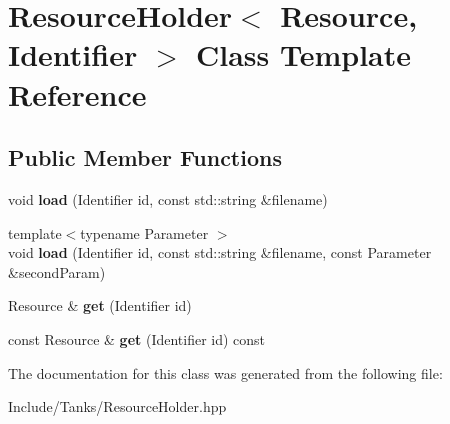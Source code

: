 \hypertarget{class_resource_holder}{}\section{Resource\+Holder$<$ Resource, Identifier $>$ Class Template Reference}
\label{class_resource_holder}
\subsection*{Public Member Functions}
\begin{DoxyCompactItemize}
\item 
\hypertarget{class_resource_holder_accb6a2b6bd2da503ddfd57b5c0028a16}{}void {\bfseries load} (Identifier id, const std\+::string \&filename)\label{class_resource_holder_accb6a2b6bd2da503ddfd57b5c0028a16}

\item 
\hypertarget{class_resource_holder_ae83a7a88b2b2a74b6143796eb4452110}{}{\footnotesize template$<$typename Parameter $>$ }\\void {\bfseries load} (Identifier id, const std\+::string \&filename, const Parameter \&second\+Param)\label{class_resource_holder_ae83a7a88b2b2a74b6143796eb4452110}

\item 
\hypertarget{class_resource_holder_a236988b27b59d66e39e38e556de2a064}{}Resource \& {\bfseries get} (Identifier id)\label{class_resource_holder_a236988b27b59d66e39e38e556de2a064}

\item 
\hypertarget{class_resource_holder_a3de78ac3453a9eff9979da463f0f51e1}{}const Resource \& {\bfseries get} (Identifier id) const \label{class_resource_holder_a3de78ac3453a9eff9979da463f0f51e1}

\end{DoxyCompactItemize}


The documentation for this class was generated from the following file\+:\begin{DoxyCompactItemize}
\item 
Include/\+Tanks/Resource\+Holder.\+hpp\end{DoxyCompactItemize}
